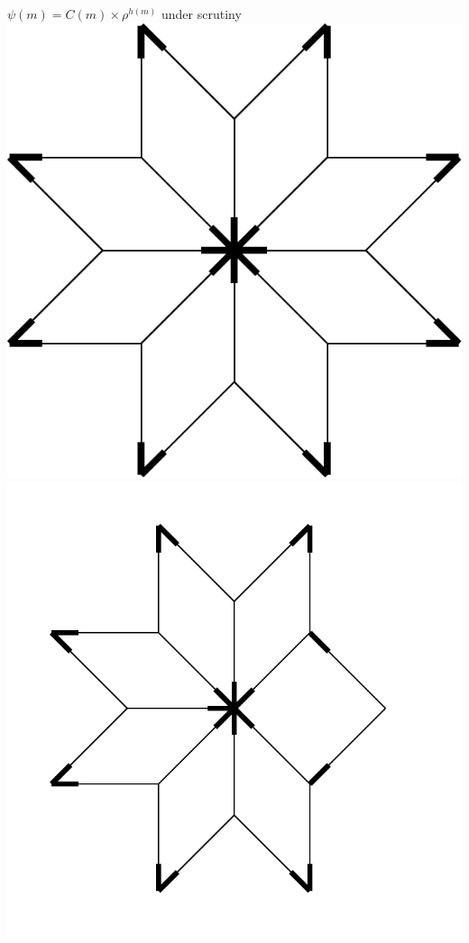 \documentclass[xcolor=x11names,compress,professionalfonts, aspectratio=169]{beamer}
\renewcommand{\(}{\begin{columns}}
\renewcommand{\)}{\end{columns}}
\newcommand{\<}[1]{\begin{column}{#1}}
\renewcommand{\>}{\end{column}}
\begin{document}
\begin{frame}{$\psi(m) = C(m) \times \rho^{h(m)}$ under scrutiny}
{\includegraphics[scale=\s]{img/env_A.pdf}
\includegraphics[scale=\s]{img/env_B.pdf}
}
\end{frame}
\end{document}

